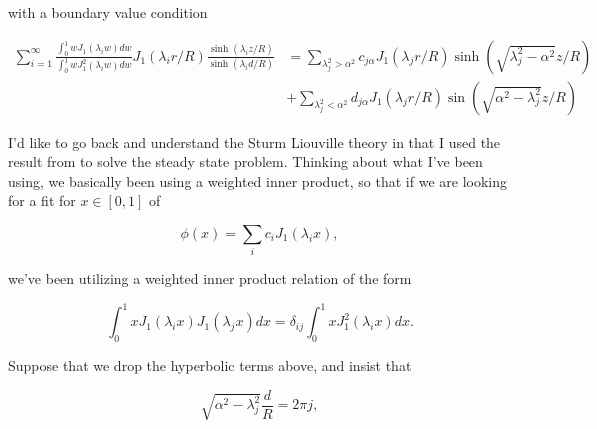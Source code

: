 with a boundary value condition

\begin{equation}\label{eqn:coffeeCupWithBottom:720f}
\begin{aligned}
\sum_{i=1}^\infty 
\frac{
\int_0^1 w J_1 (\lambda_i w) dw
}{
\int_0^1 w J_1^2 (\lambda_i w) dw
}
J_1(\lambda_i r/R) \frac{\sinh(\lambda_i z/R)}{\sinh(\lambda_i d/R) } 
&=
\sum_{\lambda_j^2 > \alpha^2} c_{j \alpha} J_1(\lambda_j r/R) \sinh\left( \sqrt{\lambda_j^2 - \alpha^2} z/R \right) \\
&+\sum_{\lambda_j^2 < \alpha^2} d_{j \alpha} J_1(\lambda_j r/R) \sin\left( \sqrt{\alpha^2 -\lambda_j^2 } z/R \right)
\end{aligned}
\end{equation}

I'd like to go back and understand the Sturm Liouville theory in \citep{sagan1989boundary} that I used the result from to solve the steady state problem.  Thinking about what I've been using, we basically been using a weighted inner product, so that if we are looking for a fit for $x \in [0,1]$ of

\begin{equation}\label{eqn:coffeeCupWithBottom:820}
\phi(x) = \sum_i c_i J_1(\lambda_i x),
\end{equation}

we've been utilizing a weighted inner product relation of the form

\begin{equation}\label{eqn:coffeeCupWithBottom:840}
\int_0^1 x J_1(\lambda_i x) J_1(\lambda_j x) dx = \delta_{ij} \int_0^1 x J_1^2(\lambda_i x) dx.
\end{equation}

Suppose that we drop the hyperbolic terms above, and insist that

\begin{equation}\label{eqn:coffeeCupWithBottom:860}
\sqrt{\alpha^2 - \lambda_j^2} \frac{d}{R} = 2 \pi j,
\end{equation}

